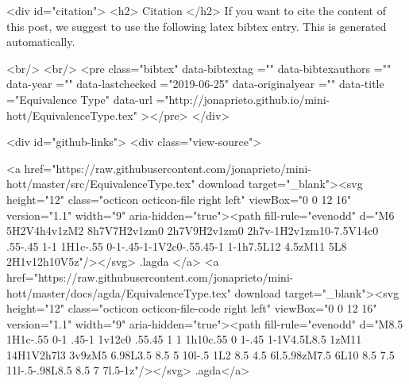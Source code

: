   
  <div id="citation">
  <h2> Citation </h2>
  If you want to cite the content of this post,
  we suggest to use the following latex bibtex entry.
  This is generated automatically.

  <br/>
  <br/>
  <pre class="bibtex"
       data-bibtextag =""
       data-bibtexauthors =""
       data-year =""
       data-lastchecked ="2019-06-25"
       data-originalyear =""
       data-title ="Equivalence Type"
       data-url ="http://jonaprieto.github.io/mini-hott/EquivalenceType.tex"
  ></pre>
  </div>
  

  <div id="github-links">
    <div class="view-source">
      
        <a href="https://raw.githubusercontent.com/jonaprieto/mini-hott/master/src/EquivalenceType.tex" download target="_blank"><svg height="12" class="octicon octicon-file right left" viewBox="0 0 12 16" version="1.1" width="9" aria-hidden="true"><path fill-rule="evenodd" d="M6 5H2V4h4v1zM2 8h7V7H2v1zm0 2h7V9H2v1zm0 2h7v-1H2v1zm10-7.5V14c0 .55-.45 1-1 1H1c-.55 0-1-.45-1-1V2c0-.55.45-1 1-1h7.5L12 4.5zM11 5L8 2H1v12h10V5z"/></svg> .lagda </a>
        <a href="https://raw.githubusercontent.com/jonaprieto/mini-hott/master/docs/agda/EquivalenceType.tex" download target="_blank"><svg height="12" class="octicon octicon-file-code right left" viewBox="0 0 12 16" version="1.1" width="9" aria-hidden="true"><path fill-rule="evenodd" d="M8.5 1H1c-.55 0-1 .45-1 1v12c0 .55.45 1 1 1h10c.55 0 1-.45 1-1V4.5L8.5 1zM11 14H1V2h7l3 3v9zM5 6.98L3.5 8.5 5 10l-.5 1L2 8.5 4.5 6l.5.98zM7.5 6L10 8.5 7.5 11l-.5-.98L8.5 8.5 7 7l.5-1z"/></svg> .agda</a>
      
